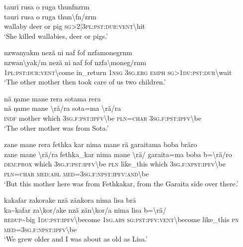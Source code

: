 \ea\label{ex:14:a3025}
tauri rusa o ruga thunfnzrm\\
\gll tauri	rusa	o	ruga	thun{\textbackslash}fn/zrm\\
     wallaby	deer	or	pig	\textsc{sg}>2|3\textsc{pl}:\textsc{pst}:\textsc{dur}:\textsc{vent}{\textbackslash}hit\\
\glt `She killed wallabies, deer or pigs.'
\z

\ea\label{ex:14:a3026}
nzwanyakm nezä ni naf fof nzfamonegrnm\\
\gll nzwan{\textbackslash}yak/m	nezä	ni	naf	fof	nzfa{\textbackslash}moneg/rnm\\
     1\textsc{pl}:\textsc{pst}:\textsc{dur}:\textsc{vent}{\textbackslash}come	in\_return	1\textsc{nsg}	3\textsc{sg}.\textsc{erg}	\textsc{emph}	\textsc{sg}>1\textsc{du}:\textsc{pst}:\textsc{dur}{\textbackslash}wait\\
\glt `The other mother then took care of us two children.'
\z

\ea\label{ex:14:a3029}
nä ŋame mane rera sotama rera\\
\gll nä	ŋame	mane	{\textbackslash}rä/ra	sota=ma	{\textbackslash}rä/ra\\
     \textsc{indf}	mother	which	3\textsc{sg}.\textsc{f}:\textsc{pst}:\textsc{ipfv}{\textbackslash}be	\textsc{pln}=\textsc{char}	3\textsc{sg}.\textsc{f}:\textsc{pst}:\textsc{ipfv}{\textbackslash}be\\
\glt `The other mother was from Sota.'
\z

\ea\label{ex:14:a3030}
zane mane rera fethka kar nima mane rä garaitama boba bräro\\
\gll zane	mane	{\textbackslash}rä/ra	fethka\_kar	nima	mane	{\textbackslash}rä/	garaita=ma	boba	b={\textbackslash}rä/ro\\
     \textsc{dem}:\textsc{prox}	which	3\textsc{sg}.\textsc{f}:\textsc{pst}:\textsc{ipfv}{\textbackslash}be	\textsc{pln}	like\_this	which	3\textsc{sg}.\textsc{f}:\textsc{npst}:\textsc{ipfv}{\textbackslash}be	\textsc{pln}=\textsc{char}	\textsc{med}:\textsc{abl}	\textsc{med}=3\textsc{sg}.\textsc{f}:\textsc{npst}:\textsc{ipfv}:\textsc{and}{\textbackslash}be\\
\glt `But this mother here was from Fethkakar, from the Garaita side over there.'
\z

\ea\label{ex:14:a3033}
kakafar zakorake nzä zänkora nima lisa brä\\
\gll ka{\textasciitilde}kafar	za{\textbackslash}kor/ake	nzä	zän{\textbackslash}kor/a	nima	lisa	b={\textbackslash}rä/\\
     \textsc{redup}{\textasciitilde}big	1\textsc{du}:\textsc{pst}:\textsc{ipfv}{\textbackslash}become	1\textsc{sg}.\textsc{abs}	\textsc{sg}:\textsc{pst}:\textsc{pfv}:\textsc{vent}{\textbackslash}become	like\_this	\textsc{pn}	\textsc{med}=3\textsc{sg}.\textsc{f}:\textsc{npst}:\textsc{ipfv}{\textbackslash}be\\
\glt `We grew older and I was about as old as Lisa.'
\z

